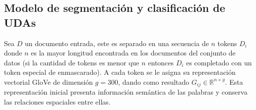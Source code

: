 \documentclass[a4paper,11pt,twocolumn,twoside]{article}
\begin{document}


\subsection{Modelo de segmentación y clasificación de UDAs}

Sea $D$ un documento entrada, este es separado en una secuencia de $n$ tokens $D_i$ donde $n$ es la mayor longitud encontrada
en los documentos del conjunto de datos (si la cantidad de tokens es menor que $n$ entonces $D_i$ es completado con un token especial de enmascarado). 
A cada token se le asigna
su representación vectorial GloVe de dimensión $g=300$, dando como resultado $G_{ij} \in \mathbb{R}^{n \times g}$.
Esta representación inicial presenta información semántica de las palabras y conserva las relaciones 
espaciales entre ellas. 
\end{document}
